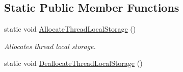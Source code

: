 \subsection*{Static Public Member Functions}
\begin{DoxyCompactItemize}
\item 
\hypertarget{class_thread_single_a082eeec139aba754fd2ebf51adb9869a}{
static void \hyperlink{class_thread_single_a082eeec139aba754fd2ebf51adb9869a}{AllocateThreadLocalStorage} ()}
\label{class_thread_single_a082eeec139aba754fd2ebf51adb9869a}

\begin{DoxyCompactList}\small\item\em Allocates thread local storage. \item\end{DoxyCompactList}\item 
\hypertarget{class_thread_single_aa841ecdd50e402ee1ef6ff6b92e1ac90}{
static void \hyperlink{class_thread_single_aa841ecdd50e402ee1ef6ff6b92e1ac90}{DeallocateThreadLocalStorage} ()}
\label{class_thread_single_aa841ecdd50e402ee1ef6ff6b92e1ac90}


\end{DoxyCompactItemize}
